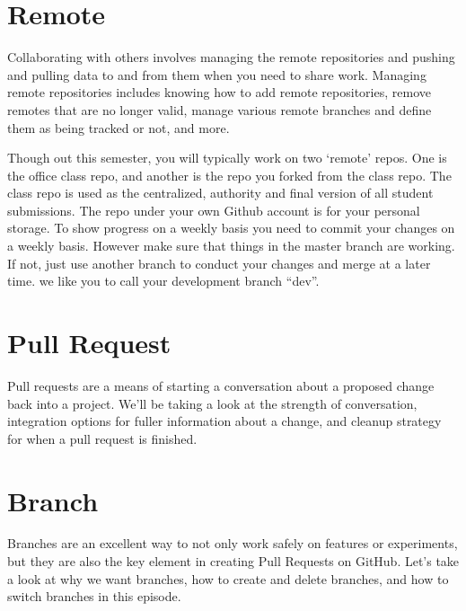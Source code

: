 
\section{Remote}\label{remote}

Collaborating with others involves managing the remote repositories
and pushing and pulling data to and from them when you need to share
work. Managing remote repositories includes knowing how to add remote
repositories, remove remotes that are no longer valid, manage various
remote branches and define them as being tracked or not, and more.

Though out this semester, you will typically work on two `remote' repos.
One is the office class repo, and another is the repo you forked from
the class repo. The class repo is used as the centralized, authority and
final version of all student submissions. The repo under your own Github
account is for your personal storage. To show progress on a weekly
basis you need to commit your changes on a weekly basis. However make
sure that things in the master branch are working. If not, just use
another branch to conduct your changes and merge at a later
time. we like you to call your development branch ``dev''.


\section{Pull Request}\label{pull-request}

Pull requests are a means of starting a conversation about a proposed
change back into a project. We'll be taking a look at the strength of
conversation, integration options for fuller information about a change,
and cleanup strategy for when a pull request is finished.


\section{Branch}\label{branch}

Branches are an excellent way to not only work safely on features or
experiments, but they are also the key element in creating Pull Requests
on GitHub. Let's take a look at why we want branches, how to create and
delete branches, and how to switch branches in this episode.

